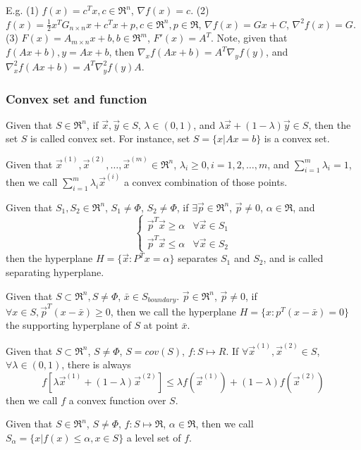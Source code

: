 E.g. (1) $f(x) = c^T x, c\in \Re^n$, $\nabla f(x) = c$. (2) $f(x)=\frac{1}{2} x^T G_{n\times n} x + c^T x + p, c\in\Re^n, p\in\Re$,
$\nabla f(x) = Gx+C$, $\nabla^2 f(x) = G$. (3) $F(x) = A_{m\times n}x+b, b\in\Re^m$, $F'(x) = A^T$.
Note, given that $f(Ax+b), y=Ax+b$, then $\nabla_x f(Ax+b) = A^T \nabla_y f(y)$,
and $\nabla_x^2 f(Ax+b) = A^T \nabla_y^2 f(y) A$.

 \subsubsection{Convex set and function}

Given that $S\in \Re^n$, if $\vec{x},\vec{y} \in S$,
$\lambda \in (0,1)$, and $\lambda \vec{x} + (1-\lambda)\vec{y} \in S$,
then the set $S$ is called convex set. For instance, set
$S = \{x | Ax = b \}$ is a convex set.

Given that $\vec{x}^{(1)},\vec{x}^{(2)},\ldots,\vec{x}^{(m)} \in \Re^n$,
$ \lambda_i \geqslant 0, i = 1, 2, \ldots, m$, and $ \sum\limits_{i=1}^m \lambda_i = 1$,
then we call $\sum\limits_{i=1}^m \lambda_i \vec{x}^{(i)}$ a convex combination of those points.

Given that $S_1, S_2 \in \Re^n$, $S_1 \neq \Phi$, $S_2 \neq \Phi$, if
$\exists \vec{p} \in \Re^n$, $\vec{p}\neq 0$, $\alpha \in \Re$, and
$$ \left\{ \begin{array}{lr}
 \vec{p}^T \vec{x} \geqslant \alpha & \forall \vec{x} \in S_1 \\
 \vec{p}^T \vec{x} \leqslant \alpha & \forall \vec{x} \in S_2
   \end{array} \right. $$
then the hyperplane $H=\{\vec{x}: P^T x = \alpha\}$ separates $S_1$ and $S_2$,
and is called separating hyperplane.

Given that $S \subset \Re^n, S \neq \Phi$, $\bar{x} \in S_{boundary}$.
$\vec{p} \in \Re^n$, $\vec{p} \neq 0$, if $\forall x \in S, \vec{p}^T (x - \bar{x}) \geqslant 0$,
then we call the hyperplane $H=\{x: p^T(x-\bar{x})=0\}$ the supporting hyperplane of $S$ at point $\bar{x}$.

Given that $S\subset \Re^n$, $S\neq \Phi$, $S=cov(S)$, $f:S\mapsto R$.
If $\forall \vec{x}^{(1)}, \vec{x}^{(2)} \in S$, $\forall \lambda \in (0, 1)$, there is always
$$ f[\lambda \vec{x}^{(1)} + (1-\lambda)\vec{x}^{(2)}] \leqslant
  \lambda f(\vec{x}^{(1)}) + (1-\lambda) f(\vec{x}^{(2)}) $$
then we call $f$ a convex function over $S$.

Given that $S\in\Re^n$, $S\neq\Phi$, $f:S\mapsto \Re$, $\alpha\in\Re$,
then we call $S_\alpha = \{ x | f(x) \leqslant \alpha, x \in S\}$
a level set of $f$.

